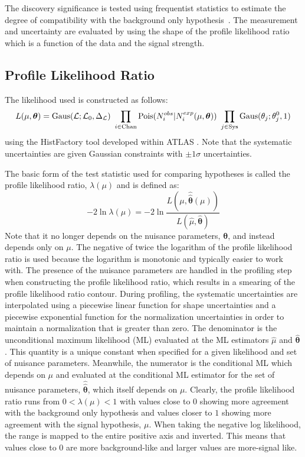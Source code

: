 The discovery significance is tested using frequentist statistics
to estimate the degree of compatibility with the background only 
hypothesis~\cite{Cowan:1277304}.
The measurement and uncertainty are evaluated 
by using the shape of the profile likelihood ratio~\cite{PDG:2014} 
which is a function of the data and the signal strength.

\subsection{Profile Likelihood Ratio}

The likelihood used is constructed as follows:
\begin{equation}
L(\mu,\boldsymbol{\theta}) = \mathrm{Gaus}(\mathcal{L};\mathcal{L}_0,\Delta_{\mathcal{L}})~\prod_{i\in\mathrm{Chan}} \mathrm{Pois}(N_i^{obs}|N_i^{exp}(\mu,\boldsymbol{\theta}))~\prod_{j\in\mathrm{Sys}} \mathrm{Gaus}(\theta_j;\theta_j^0,1)
\label{eq:poisson_likelihood}
\end{equation}
using the HistFactory tool developed within ATLAS \cite{Cranmer:1456844}. 
Note that the systematic uncertainties are given Gaussian 
constraints with $\pm1\sigma$ uncertainties.

The basic form of the 
test statistic used for comparing hypotheses is called the profile likelihood 
ratio, $\lambda(\mu)$ and is defined as:
\begin{equation}
-2 \ln \lambda(\mu) = -2 \ln \frac{L(\mu,\hat{\hat{\boldsymbol{\theta}}}(\mu))}{L(\hat{\mu},\hat{\boldsymbol{\theta}})}
\label{eq:profile_likelihood_ratio}
\end{equation}
Note that it no longer depends on the nuisance parameters, $\boldsymbol{\theta}$,
and instead depends only on $\mu$. 
The negative of twice the logarithm of the profile likelihood 
ratio is used because
the logarithm is monotonic and typically easier to work with.
The presence of the nuisance parameters are handled in the profiling 
step when constructing the profile likelihood ratio,  which results 
in a smearing of the profile likelihood ratio contour. 
During profiling, the systematic uncertainties are
interpolated using a piecewise linear function for shape uncertainties
and a piecewise exponential function for the normalization uncertainties
in order to maintain a normalization that is greater than zero.
The denominator is the 
unconditional maximum likelihood (ML)
evaluated at the ML estimators $\hat{\mu}$ and $\hat{\boldsymbol{\theta}}$.
This quantity is a unique constant when specified for a given likelihood
and set of nuisance parameters.
Meanwhile, the numerator is the conditional ML which depends on $\mu$ and
evaluated at 
the conditional ML estimator for the set of nuisance parameters, 
$\hat{\hat{\boldsymbol{\theta}}}$, which itself depends on $\mu$.
Clearly, the profile likelihood ratio runs from $0 < \lambda(\mu) < 1$
with values close to $0$ showing more agreement with the background 
only hypothesis and values closer to $1$ showing more agreement with 
the signal hypothesis, $\mu$. 
When taking the negative log likelihood, the range
is mapped to the entire positive axis and inverted. This means
that values close to $0$ are more background-like and larger values 
are more-signal like.  

